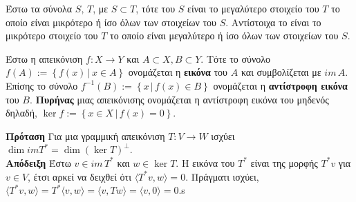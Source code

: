 Έστω τα σύνολα $S, \, T$, με $S \subset T$, τότε  του $S$ είναι το μεγαλύτερο στοιχείο του $T$ το οποίο είναι μικρότερο ή ίσο όλων των στοιχείων του $S$. Αντίστοιχα το  είναι το μικρότερο στοιχείο του $T$ το οποίο είναι μεγαλύτερο ή ίσο όλων των στοιχείων του $S$.

Έστω η απεικόνιση $f:X \rightarrow Y$ και $A \subset X, B\subset Y$. Τότε το σύνολο $f(A):=\left\{f(x)\,|\,x \in A \right\}$ ονομάζεται η \textbf{εικόνα} του $A$ και συμβολίζεται με $im\,A$. Επίσης το σύνολο $f^{-1}(B):=\left\{x\,|\,f(x) \in B\right\}$ ονομάζεται η \textbf{αντίστροφη εικόνα} του $B$. \textbf{Πυρήνας} μιας απεικόνισης ονομάζεται η αντίστροφη εικόνα του μηδενός δηλαδή, $\ker f :=\left\{x \in X\,|\,f(x) = 0\right\}$.

\textbf{Πρόταση} Για μια γραμμική απεικόνιση $T:V\rightarrow W$ ισχύει $\dim im T^{*} = \dim(\ker T)^{\bot}$.\\ \textbf{Απόδειξη} Έστω $v\in im\,T^*$ και $w\in \ker T$. Η εικόνα του $T^*$ είναι της μορφής $T^*v$ για $v \in V$, έτσι αρκεί να δειχθεί ότι $\langle T^*v, w \rangle = 0$. Πράγματι ισχύει, $\langle T^*v, w \rangle = T^*\langle v, w \rangle = \langle v, Tw \rangle = \langle v, 0 \rangle = 0$.s